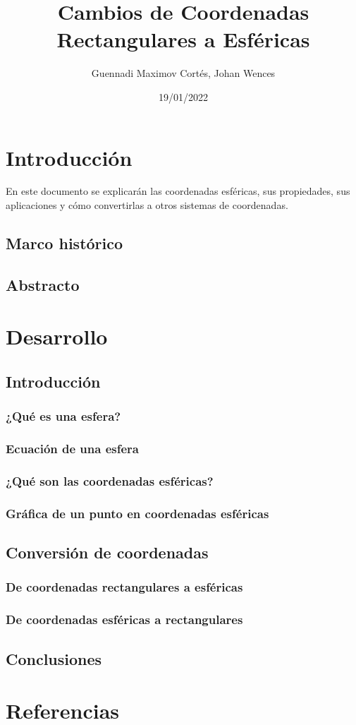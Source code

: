 \documentclass[letterpaper,14pt]{extreport} %
\title{Cambios de Coordenadas Rectangulares a Esféricas} %
\author{Guennadi Maximov Cortés, Johan Wences} %
\date{19/01/2022} %
\begin{document}
  \maketitle
  \tableofcontents
  \newpage
  
  \chapter{Introducción}
    En este documento se explicarán las coordenadas esféricas, sus propiedades, sus aplicaciones y cómo convertirlas a otros sistemas de coordenadas.
  \section{Marco histórico}
    
  \section{Abstracto}
    
  
  \chapter{Desarrollo}
  \renewcommand{\chaptername}{Jornada}
  \section{Introducción}
    \subsection{¿Qué es una esfera?}
        
    \subsection{Ecuación de una esfera}
        
    \subsection{¿Qué son las coordenadas esféricas?}
        
    \subsection{Gráfica de un punto en coordenadas esféricas}
        
  \section{Conversión de coordenadas}
    \subsection{De coordenadas rectangulares a esféricas}
        
    \subsection{De coordenadas esféricas a rectangulares}
        
  \section{Conclusiones}
  
  \chapter{Referencias}
    
  
\end{document}
